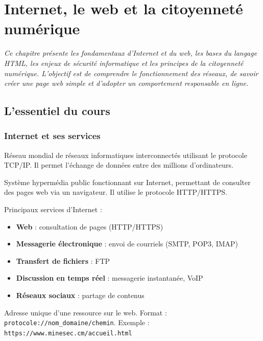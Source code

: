 \chapter{Internet, le web et la citoyenneté numérique}

\textit{Ce chapitre présente les fondamentaux d'Internet et du web, les bases du langage HTML, les enjeux de sécurité informatique et les principes de la citoyenneté numérique. L'objectif est de comprendre le fonctionnement des réseaux, de savoir créer une page web simple et d'adopter un comportement responsable en ligne.}

\section{L'essentiel du cours}

\subsection{Internet et ses services}
\begin{definition}[Internet]
Réseau mondial de réseaux informatiques interconnectés utilisant le protocole TCP/IP. Il permet l'échange de données entre des millions d'ordinateurs.
\end{definition}

\begin{definition}
Système hypermédia public fonctionnant sur Internet, permettant de consulter des pages web via un navigateur. Il utilise le protocole HTTP/HTTPS.
\end{definition}

Principaux services d'Internet :
\begin{itemize}
    \item \textbf{Web} : consultation de pages (HTTP/HTTPS)
    \item \textbf{Messagerie électronique} : envoi de courriels (SMTP, POP3, IMAP)
    \item \textbf{Transfert de fichiers} : FTP
    \item \textbf{Discussion en temps réel} : messagerie instantanée, VoIP
    \item \textbf{Réseaux sociaux} : partage de contenus
\end{itemize}

\begin{definition}
Adresse unique d'une ressource sur le web. Format : \texttt{protocole://nom\_domaine/chemin}. Exemple : \texttt{https://www.minesec.cm/accueil.html}
\end{definition}

